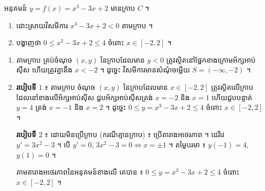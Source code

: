 \begin{example}[លំហាត់គំរូ]
អនុគមន៍ $y = f(x) = x^3 - 3x + 2$ មានក្រាប $C$ ។
\begin{enumerate}[a]
  \item ដោះស្រាយវិសមីការ $x^3 - 3x + 2 < 0$ តាមក្រាប ។
  \item បង្ហាញថា $0 \le x^3 - 3x + 2 \le 4$ ចំពោះ $x \in [-2, 2]$ ។
\end{enumerate}
\end{example}
\ans
\begin{center}
\end{center}
\begin{enumerate}[a]
  \item តាមក្រាប គ្រប់ចំណុច $(x, y)$ នៃក្រាបដែលមាន $y < 0$ ត្រូវស្ថិតនៅផ្នែកខាងក្រោមអ័ក្សអាប់ស៊ីស ហើយត្រូវគ្នានឹង $x < -2$ ។ ដូច្នេះ វិសមីការមានសំណុំចម្លើយ $S = (-\infty, -2)$ ។
  \item \textbf{របៀបទី $1$} ៖ តាមក្រាប ចំណុច $(x, y)$ នៃក្រាបដែលមាន $x \in [-2, 2]$ ត្រូវស្ថិតលើក្រាបដែលនៅខាងលើអ័ក្សអាប់ស៊ីស ជួបអ័ក្សអាប់ស៊ីសត្រង់ $x = -2$ និង $x = 1$ ហើយជួបបន្ទាត់ $y = 4$ ត្រង់ $x = -1$ និង $x = 2$ ។ ដូច្នេះ $0 \le y = x^3 - 3x + 2 \le 4$ ចំពោះ $x \in [-2, 2]$ ។

  \textbf{របៀបទី $2$} ៖ ដោយមិនប្រើក្រាប (ករណីគ្មានក្រាប) ៖ ប្រើតារាងអថេរភាព ។ ដេរីវេ $y' = 3x^2 - 3$ ។ បើ $y' = 0$, $3x^2 - 3 = 0 \Leftrightarrow x = \pm 1$ ។ តម្លៃបរមា ៖ $y(-1) = 4$, $y(1) = 0$ ។
  \begin{center}
  \end{center}
  តាមតារាងអថេរភាពនៃអនុគមន៍ខាងលើ គេបាន ៖ $0 \le y = x^3 - 3x + 2 \le 4$ ចំពោះ $x \in [-2, 2]$ ។
\end{enumerate}

